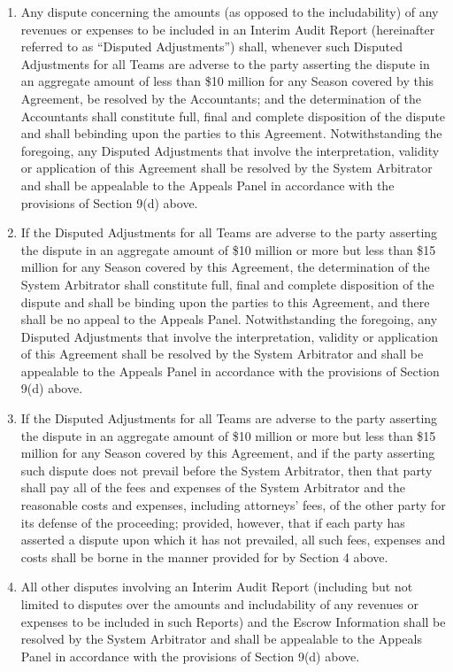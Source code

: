 \documentclass[
]{book}
\begin{document}
\begin{enumerate}
\item
  Any dispute concerning the amounts (as opposed to the includability) of any revenues or expenses to be included in an Interim Audit Report (hereinafter referred to as ``Disputed Adjustments'') shall, whenever such Disputed Adjustments for all Teams are adverse to the party asserting the dispute in an aggregate amount of less than \$10 million for any Season covered by this Agreement, be resolved by the Accountants; and the determination of the Accountants shall constitute full, final and complete disposition of the dispute and shall bebinding upon the parties to this Agreement. Notwithstanding the foregoing, any Disputed Adjustments that involve the interpretation, validity or application of this Agreement shall be resolved by the System Arbitrator and shall be appealable to the Appeals Panel in accordance with the provisions of Section 9(d) above.
\item
  If the Disputed Adjustments for all Teams are adverse to the party asserting the dispute in an aggregate amount of \$10 million or more but less than \$15 million for any Season covered by this Agreement, the determination of the System Arbitrator shall constitute full, final and complete disposition of the dispute and shall be binding upon the parties to this Agreement, and there shall be no appeal to the Appeals Panel. Notwithstanding the foregoing, any Disputed Adjustments that involve the interpretation, validity or application of this Agreement shall be resolved by the System Arbitrator and shall be appealable to the Appeals Panel in accordance with the provisions of Section 9(d) above.
\item
  If the Disputed Adjustments for all Teams are adverse to the party asserting the dispute in an aggregate amount of \$10 million or more but less than \$15 million for any Season covered by this Agreement, and if the party asserting such dispute does not prevail before the System Arbitrator, then that party shall pay all of the fees and expenses of the System Arbitrator and the reasonable costs and expenses, including attorneys' fees, of the other party for its defense of the proceeding; provided, however, that if each party has asserted a dispute upon which it has not prevailed, all such fees, expenses and costs shall be borne in the manner provided for by Section 4 above.
\item
  All other disputes involving an Interim Audit Report (including but not limited to disputes over the amounts and includability of any revenues or expenses to be included in such Reports) and the Escrow Information shall be resolved by the System Arbitrator and shall be appealable to the Appeals Panel in accordance with the provisions of Section 9(d) above.
\end{enumerate}
\end{document}
